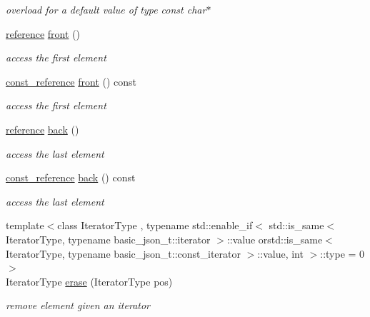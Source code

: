 \begin{DoxyCompactItemize}
\begin{DoxyCompactList}\small\item\em overload for a default value of type const char$\ast$ \end{DoxyCompactList}\item 
\hyperlink{classnlohmann_1_1basic__json_ac6a5eddd156c776ac75ff54cfe54a5bc}{reference} \hyperlink{classnlohmann_1_1basic__json_a3acba9c6ceb7214e565fe08c3ba5b352}{front} ()
\begin{DoxyCompactList}\small\item\em access the first element \end{DoxyCompactList}\item 
\hyperlink{classnlohmann_1_1basic__json_a4057c5425f4faacfe39a8046871786ca}{const\+\_\+reference} \hyperlink{classnlohmann_1_1basic__json_a5ba7f454ead9015dda166c580aeadeb4}{front} () const 
\begin{DoxyCompactList}\small\item\em access the first element \end{DoxyCompactList}\item 
\hyperlink{classnlohmann_1_1basic__json_ac6a5eddd156c776ac75ff54cfe54a5bc}{reference} \hyperlink{classnlohmann_1_1basic__json_a011397134847f36db0ed7d7a93753677}{back} ()
\begin{DoxyCompactList}\small\item\em access the last element \end{DoxyCompactList}\item 
\hyperlink{classnlohmann_1_1basic__json_a4057c5425f4faacfe39a8046871786ca}{const\+\_\+reference} \hyperlink{classnlohmann_1_1basic__json_a14c9e9d157a0fe7b7d3be102d1b47fa9}{back} () const 
\begin{DoxyCompactList}\small\item\em access the last element \end{DoxyCompactList}\item 
{\footnotesize template$<$class Iterator\+Type , typename std\+::enable\+\_\+if$<$ std\+::is\+\_\+same$<$ Iterator\+Type, typename basic\+\_\+json\+\_\+t\+::iterator $>$\+::value orstd\+::is\+\_\+same$<$ Iterator\+Type, typename basic\+\_\+json\+\_\+t\+::const\+\_\+iterator $>$\+::value, int $>$\+::type  = 0$>$ }\\Iterator\+Type \hyperlink{classnlohmann_1_1basic__json_a068a16e76be178e83da6a192916923ed}{erase} (Iterator\+Type pos)
\begin{DoxyCompactList}\small\item\em remove element given an iterator \end{DoxyCompactList}\item 

\end{DoxyCompactItemize}
